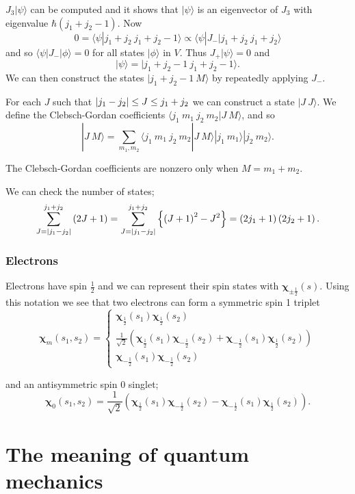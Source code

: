 \documentclass{notes}
\newcommand{\bra}[1]{\langle#1|}
\newcommand{\ket}[1]{|#1\rangle}
\newcommand{\scp}[2]{\langle#1|#2\rangle}
\newcommand{\cv}{\boldsymbol{\chi}}
\begin{document}
$J_3 \ket{\psi}$ can be computed and it shows that $\ket{\psi}$ is an
eigenvector of $J_3$ with eigenvalue $\hbar \left(j_1 + j_2 -
  1\right)$.  Now
\[
0 = \scp{\psi}{j_1 + j_2\ j_1 + j_2 - 1} \propto
\bra{\psi} J_- \ket{j_1 + j_2\ j_1 + j_2}
\]
and so $\bra{\psi} J_- \ket{\phi} = 0$ for all states $\ket{\phi}$ in $V$.
Thus $J_+ \ket{\psi} = 0$ and
\[
\ket{\psi} = \ket{j_1 + j_2 - 1\ j_1 + j_2- 1}.
\]
We can then construct the states $\ket{j_1 + j_2 - 1\ M}$ by
repeatedly applying $J_-$.

For each $J$ such that $\left|j_1 - j_2\right| \le J \le j_1 + j_2$ we can
construct a state $\ket{J\ J}$.  We define the Clebsch-Gordan coefficients
$\scp{j_1\ m_1\ j_2\ m_2}{J\ M}$, and so
\[
\ket{J\ M} = \sum_{m_1, m_2} \scp{j_1\ m_1\ j_2\ m_2}{J\ M}
\ket{j_1\ m_1} \ket{j_2\ m_2}.
\]

The Clebsch-Gordan coefficients are nonzero only when $M = m_1 + m_2$.

We can check the number of states;
\[
\sum_{J = \left|j_1 - j_2\right|}^{j_1 + j_2}
\left( 2 J + 1\right)
= \sum_{J = \left|j_1 - j_2\right|}^{j_1 + j_2} \left\{ \left(J+1\right)^2
- J^2 \right\} = \left(2 j_1 + 1 \right) \left(2 j_2 + 1 \right).
\]

\subsubsection*{Electrons}

Electrons have spin $\frac{1}{2}$ and we can represent their spin states
with $\cv_{\pm \frac{1}{2}}(s)$.  Using this notation we see that
two electrons can form a symmetric spin 1 triplet
\[
\cv_m(s_1,s_2) = \begin{cases}
\cv_{\frac{1}{2}} (s_1) \cv_{\frac{1}{2}}(s_2) \\
\frac{1}{\sqrt{2}} \left(
\cv_{\frac{1}{2}} (s_1) \cv_{-\frac{1}{2}}(s_2)
+ \cv_{-\frac{1}{2}} (s_1) \cv_{\frac{1}{2}}(s_2)
\right) \\
\cv_{-\frac{1}{2}} (s_1) \cv_{-\frac{1}{2}}(s_2)
\end{cases}
\]

and an antisymmetric spin 0 singlet;
\[
\cv_0(s_1,s_2) = \frac{1}{\sqrt{2}} \left(
\cv_{\frac{1}{2}}(s_1) \cv_{-\frac{1}{2}}(s_2)
- \cv_{-\frac{1}{2}} (s_1) \cv_{\frac{1}{2}}(s_2)
\right).
\]

\section{The meaning of quantum mechanics}
\end{document}

